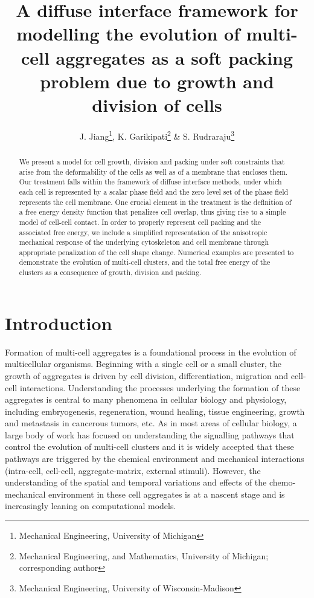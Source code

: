 \documentclass{article}
\title{A diffuse interface framework for modelling the evolution of multi-cell aggregates as a soft packing problem due to growth and division of cells}
\author{J. Jiang\thanks{Mechanical Engineering, University of Michigan}, K. Garikipati\thanks{Mechanical Engineering, and Mathematics, University of Michigan; corresponding author} \& S. Rudraraju\thanks{Mechanical Engineering, University of Wisconsin-Madison}}
\date
\begin{document}
\maketitle

\begin{abstract}
    We present a model for cell growth, division and packing under soft constraints that arise from the deformability of the cells as well as of a membrane that encloses them. Our treatment falls within the framework of diffuse interface methods, under which each cell is represented by a scalar phase field and the zero level set of the phase field represents the cell membrane. One crucial element in the treatment is the definition of a free energy density function that penalizes cell overlap, thus giving rise to a simple model of cell-cell contact. In order to properly represent cell packing and the associated free energy, we include a simplified representation of the anisotropic mechanical response of the underlying cytoskeleton and cell membrane through appropriate penalization of the cell shape change. Numerical examples are presented to demonstrate the evolution of multi-cell clusters, and the total free energy of the clusters as a consequence of growth, division and packing. 
\end{abstract}

\section{Introduction}
Formation of multi-cell aggregates is a foundational process in the evolution of multicellular organisms. Beginning with a single cell or a small cluster, the growth of aggregates is driven by cell division, differentiation, migration and cell-cell interactions. Understanding the processes underlying the formation of these aggregates is central to many phenomena in cellular biology and physiology, including embryogenesis, regeneration, wound healing, tissue engineering, growth and metastasis in cancerous tumors, etc. As in most areas of cellular biology, a large body of work has focused on understanding the signalling pathways that control the evolution of multi-cell clusters and it is widely accepted that these pathways are triggered by the chemical environment and mechanical interactions (intra-cell, cell-cell, aggregate-matrix, external stimuli). However, the understanding of the spatial and temporal variations and effects of the chemo-mechanical environment in these cell aggregates is at a nascent stage and is increasingly leaning on computational models. 
\end{document}
